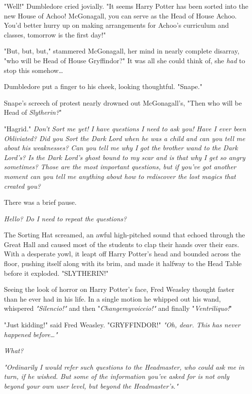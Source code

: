 "Well!" Dumbledore cried jovially. "It seems Harry Potter has been sorted into the new House of Achoo! McGonagall, you can serve as the Head of House Achoo. You'd better hurry up on making arrangements for Achoo's curriculum and classes, tomorrow is the first day!"

"But, but, but," stammered McGonagall, her mind in nearly complete disarray, "who will be Head of House Gryffindor?" It was all she could think of, she \emph{had} to stop this somehow{\ldots}

Dumbledore put a finger to his cheek, looking thoughtful. "Snape."

Snape's screech of protest nearly drowned out McGonagall's, "Then who will be Head of \emph{Slytherin?}"

"Hagrid."
\sbreak
\emph{Don't Sort me yet! I have questions I need to ask you! Have I ever been Obliviated? Did you Sort the Dark Lord when he was a child and can you tell me about his weaknesses? Can you tell me why I got the brother wand to the Dark Lord's? Is the Dark Lord's ghost bound to my scar and is that why I get so angry sometimes? Those are the most important questions, but if you've got another moment can you tell me anything about how to rediscover the lost magics that created you?}

There was a brief pause.

\emph{Hello? Do I need to repeat the questions?}

The Sorting Hat screamed, an awful high-pitched sound that echoed through the Great Hall and caused most of the students to clap their hands over their ears. With a desperate yowl, it leapt off Harry Potter's head and bounded across the floor, pushing itself along with its brim, and made it halfway to the Head Table before it exploded.
\sbreak
"SLYTHERIN!"

Seeing the look of horror on Harry Potter's face, Fred Weasley thought faster than he ever had in his life. In a single motion he whipped out his wand, whispered \emph{"Silencio!"} and then "\emph{Changemyvoiceio!"} and finally "\emph{Ventriliquo!}"

"Just kidding!" said Fred Weasley. "GRYFFINDOR!"
\sbreak
\emph{"Oh, dear. This has never happened before{\ldots}"}

\emph{What?}

\emph{"Ordinarily I would refer such questions to the Headmaster, who could ask me in turn, if he wished. But some of the information you've asked for is not only beyond your own user level, but beyond the Headmaster's."}

